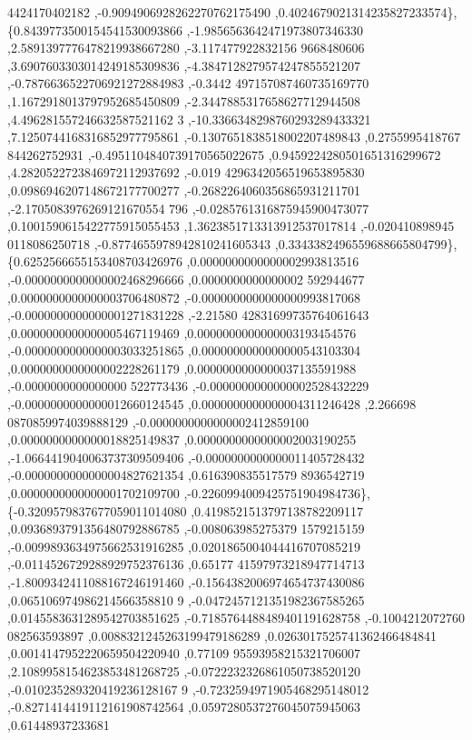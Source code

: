 \begin{DoxyCode}
      4424170402182 ,-0.9094906928262270762175490 ,0.4024679021314235827233574\},
\{0.8439773500154541530093866 ,-1.9856563642471973807346330 ,2.5891397776478219938667280 ,-3.117477922832156
      9668480606 ,3.6907603303014249185309836 ,-4.3847128279574247855521207 ,-0.7876636522706921272884983 ,-0.3442
      497157087460735169770 ,1.1672918013797952685450809 ,-2.3447885317658627712944508 ,4.496281557246632587521162
      3 ,-10.3366348298760293289433321 ,7.1250744168316852977795861 ,-0.1307651838518002207489843 ,0.2755995418767
      844262752931 ,-0.4951104840739170565022675 ,0.9459224280501651316299672 ,4.2820522723846972112937692 ,-0.019
      4296342056519653895830 ,0.0986946207148672177700277 ,-0.2682264060356865931211701 ,-2.1705083976269121670554
      796 ,-0.0285761316875945900473077 ,0.1001590615422775915055453 ,1.3623851713313912537017814 ,-0.020410898945
      0118086250718 ,-0.8774655978942810241605343 ,0.3343382496559688665804799\},
\{0.6252566655153408703426976 ,0.0000000000000002993813516 ,-0.0000000000000002468296666 ,0.0000000000000002
      592944677 ,0.0000000000000003706480872 ,-0.0000000000000000993817068 ,-0.0000000000000001271831228 ,-2.21580
      42831699735764061643 ,0.0000000000000005467119469 ,0.0000000000000003193454576 ,-0.0000000000000003033251865
       ,0.0000000000000000543103304 ,0.0000000000000002228261179 ,0.0000000000000037135591988 ,-0.0000000000000000
      522773436 ,-0.0000000000000002528432229 ,-0.0000000000000012660124545 ,0.0000000000000004311246428 ,2.266698
      0870859974039888129 ,-0.0000000000000002412859100 ,0.0000000000000018825149837 ,0.0000000000000002003190255 
      ,-1.0664419040063737309509406 ,-0.0000000000000011405728432 ,-0.0000000000000004827621354 ,0.616390835517579
      8936542719 ,0.0000000000000001702109700 ,-0.2260994009425751904984736\},
\{-0.3209579837677059011014080 ,0.4198521513797138782209117 ,0.0936893791356480792886785 ,-0.008063985275379
      1579215159 ,-0.0099893634975662531916285 ,0.0201865004044416707085219 ,-0.0114526729288929752376136 ,0.65177
      41597973218947714713 ,-1.8009342411088167246191460 ,-0.1564382006974654737430086 ,0.065106974986214566358810
      9 ,-0.0472457121351982367585265 ,0.0145583631289542703851625 ,-0.7185764488489401191628758 ,-0.1004212072760
      082563593897 ,0.0088321245263199479186289 ,0.0263017525741362466484841 ,0.0014147952220659504220940 ,0.77109
      95593958215321706007 ,2.1089958154623853481268725 ,-0.0722232326861050738520120 ,-0.010235289320419236128167
      9 ,-0.7232594971905468295148012 ,-0.8271414419112161908742564 ,0.0597280537276045075945063 ,0.61448937233681

\end{DoxyCode}
